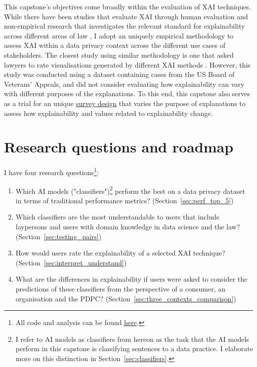 \documentclass[11pt]{article}
\begin{document}
This capstone's objectives come broadly within the evaluation of XAI techniques. While there have been studies that evaluate XAI through human evaluation \cite{vilone2021} and non-empirical research that investigates the relevant standard for explainability across different areas of law \cite{hacker2022varieties}, I adopt an uniquely empirical methodology to assess XAI within a data privacy context across the different use cases of stakeholders. The closest study using similar methodology is one that asked lawyers to rate visualisations generated by different XAI methods \cite{gorski2021}. However, this study was conducted using a dataset containing cases from the US Board of Veterans' Appeals, and did not consider evaluating how explainability can vary with different purposes of the explanations. To this end, this capstone also serves as a trial for an unique \hyperref[sec:survey_method]{survey design} that varies the purpose of explanations to assess how explainability and values related to explainability change.

\section{Research questions and roadmap}
\label{chap1:research_questions}
I have four research questions\footnote{All code and analysis can be found \href{https://github.com/TristanKoh/capstone-repo/}{here}.}: 

\begin{enumerate}
  \item Which AI models ("classifiers")\footnote{I refer to AI models as classifiers from hereon as the task that the AI models perform in this capstone is classifying sentences to a data practice. I elaborate more on this distinction in Section~\ref{sec:classifiers}.} perform the best on a data privacy dataset in terms of traditional performance metrics? (Section~\ref{sec:perf_top_5})
  
  \item Which classifiers are the most understandable to users that include laypersons and users with domain knowledge in data science and the law? (Section~\ref{sec:testing_pairs})
  
  \item How would users rate the explainability of a selected XAI technique? (Section~\ref{sec:interpret_understand})

  \item What are the differences in explainability if users were asked to consider the predictions of these classifiers from the perspective of a consumer, an organisation and the PDPC? (Section~\ref{sec:three_contexts_comparison})
\end{enumerate}
\end{document}
